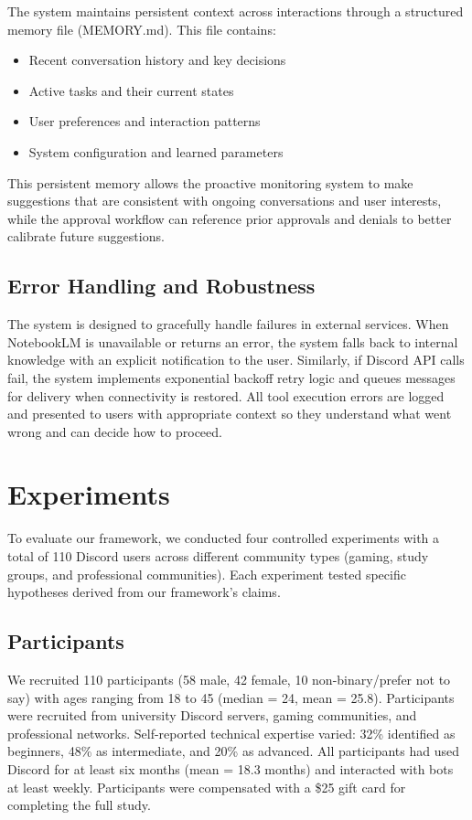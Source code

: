 \documentclass[letterpaper,10pt]{article}
\begin{document}
The system maintains persistent context across interactions through a structured memory file (MEMORY.md). This file contains:
\begin{itemize}
    \item Recent conversation history and key decisions
    \item Active tasks and their current states
    \item User preferences and interaction patterns
    \item System configuration and learned parameters
\end{itemize}

This persistent memory allows the proactive monitoring system to make suggestions that are consistent with ongoing conversations and user interests, while the approval workflow can reference prior approvals and denials to better calibrate future suggestions.

\subsection{Error Handling and Robustness}
\label{subsec:error_handling}

The system is designed to gracefully handle failures in external services. When NotebookLM is unavailable or returns an error, the system falls back to internal knowledge with an explicit notification to the user. Similarly, if Discord API calls fail, the system implements exponential backoff retry logic and queues messages for delivery when connectivity is restored. All tool execution errors are logged and presented to users with appropriate context so they understand what went wrong and can decide how to proceed.

\section{Experiments}
To evaluate our framework, we conducted four controlled experiments with a total of 110 Discord users across different community types (gaming, study groups, and professional communities). Each experiment tested specific hypotheses derived from our framework's claims.

\subsection{Participants}
\label{subsec:participants}

We recruited 110 participants (58 male, 42 female, 10 non-binary/prefer not to say) with ages ranging from 18 to 45 (median = 24, mean = 25.8). Participants were recruited from university Discord servers, gaming communities, and professional networks. Self-reported technical expertise varied: 32\% identified as beginners, 48\% as intermediate, and 20\% as advanced. All participants had used Discord for at least six months (mean = 18.3 months) and interacted with bots at least weekly. Participants were compensated with a \$25 gift card for completing the full study.
\end{document}

